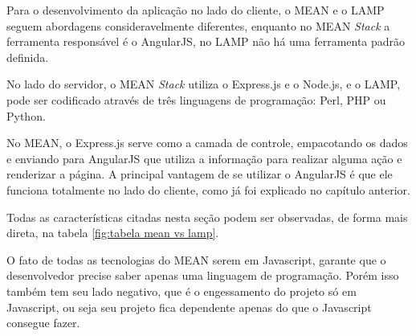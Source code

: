     Para o desenvolvimento da aplicação no lado do cliente, o MEAN e o LAMP seguem abordagens consideravelmente diferentes, enquanto no MEAN \textit{Stack} a ferramenta responsável é o AngularJS, no LAMP não há uma ferramenta padrão definida.  
    
    No lado do servidor, o MEAN \textit{Stack} utiliza o  Express.js e o Node.js, e o LAMP, pode ser codificado através de três linguagens de programação: Perl, PHP ou Python.
    
    No MEAN, o Express.js serve como a camada de controle, empacotando os dados e enviando para AngularJS que utiliza a informação para realizar alguma ação e renderizar a página. A principal vantagem de se utilizar o AngularJS é que ele funciona totalmente no lado do cliente, como já foi explicado no capítulo anterior.
    
    Todas as características citadas nesta seção podem ser observadas, de forma mais direta, na tabela \ref{fig:tabela mean vs lamp}.
    
    O fato de todas as tecnologias do MEAN serem em Javascript, garante que o desenvolvedor precise saber apenas uma linguagem de programação. Porém isso também tem seu lado negativo, que é o engessamento do projeto só em Javascript, ou seja seu projeto fica dependente apenas do que o Javascript consegue fazer.
    

